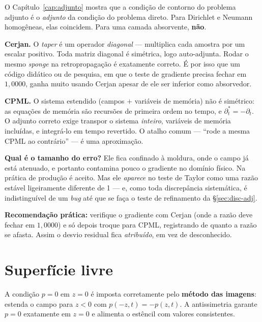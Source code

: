 \documentclass[11pt,a4paper,oneside]{report}
\begin{document}
\begin{armadilha}
O Cap\'itulo~\ref{cap:adjunto} mostra que a condi\c{c}\~ao de contorno do
problema adjunto \'e o \emph{adjunto} da condi\c{c}\~ao do problema direto.
Para Dirichlet e Neumann homog\^eneas, elas coincidem. Para uma camada
absorvente, \textbf{n\~ao}.

\textbf{Cerjan.} O \emph{taper} \'e um operador \emph{diagonal} --- multiplica
cada amostra por um escalar positivo. Toda matriz diagonal \'e sim\'etrica,
logo auto-adjunta. Rodar o mesmo \emph{sponge} na retropropaga\c{c}\~ao
\'e exatamente correto. \'E por isso que um c\'odigo did\'atico ou de
pesquisa, em que o teste de gradiente precisa fechar em $1{,}0000$, ganha
muito usando Cerjan apesar de ele ser inferior como absorvedor.

\textbf{CPML.} O sistema estendido (campos $+$ vari\'aveis de mem\'oria) n\~ao
\'e sim\'etrico: as equa\c{c}\~oes de mem\'oria s\~ao recurs\~oes de primeira
ordem no tempo, e $\partial_t^{*} = -\partial_t$. O adjunto correto exige
transpor o sistema \emph{inteiro}, vari\'aveis de mem\'oria inclu\'idas, e
integr\'a-lo em tempo revertido. O atalho comum --- ``rode a mesma CPML ao
contr\'ario'' --- \'e uma aproxima\c{c}\~ao.

\textbf{Qual \'e o tamanho do erro?} Ele fica confinado \`a moldura, onde o
campo j\'a est\'a atenuado, e portanto contamina pouco o gradiente no
dom\'inio f\'isico. Na pr\'atica de produ\c{c}\~ao \'e aceito. Mas ele
\emph{aparece} no teste de Taylor como uma raz\~ao est\'avel ligeiramente
diferente de 1 --- e, como toda discrep\^ancia sistem\'atica, \'e
indistingu\'ivel de um \emph{bug} at\'e que se fa\c{c}a o teste de
refinamento da §\ref{sec:disc-adj}.

\textbf{Recomenda\c{c}\~ao pr\'atica:} verifique o gradiente com Cerjan (onde
a raz\~ao deve fechar em $1{,}0000$) e s\'o depois troque para CPML,
registrando de quanto a raz\~ao se afasta. Assim o desvio residual fica
\emph{atribu\'ido}, em vez de desconhecido.
\end{armadilha}

\section{Superf\'icie livre}

A condi\c{c}\~ao $p = 0$ em $z=0$ \'e imposta corretamente pelo
\textbf{m\'etodo das imagens}: estenda o campo para $z<0$ com
$p(-z,t) = -p(z,t)$. A antissimetria garante $p=0$ exatamente em $z=0$ e
alimenta o est\^encil com valores consistentes.
\end{document}
